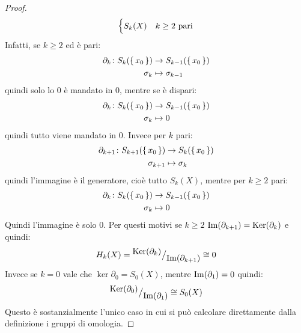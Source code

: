 \begin{proof}
\[\begin{cases}
      S_k(X)  & \text{$ k \geq 2$ pari}
    \end{cases}
  \]
  Infatti, se $ k \geq 2 $ ed è pari:
  \begin{align*}
    \partial_k \colon S_k(\set{x_0}) & \to S_{k-1}(\set{x_0}) \\
    \sigma_k & \mapsto \sigma_{k-1}
  \end{align*}
  quindi solo lo $ 0 $ è mandato in $ 0 $, mentre se è dispari:
  \begin{align*}
    \partial_k \colon S_k(\set{x_0}) & \to S_{k-1}(\set{x_0}) \\
    \sigma_k & \mapsto 0
  \end{align*}
  quindi tutto viene mandato in $ 0 $.
  Invece per $ k $ pari:
  \begin{align*}
    \partial_{k+1} \colon S_{k+1}(\set{x_0}) & \to S_{k}(\set{x_0}) \\
    \sigma_{k+1} & \mapsto \sigma_{k}
  \end{align*}
  quindi l'immagine è il generatore, cioè tutto $ S_{k}(X) $, mentre per $ k \geq 2$ pari:
  \begin{align*}
    \partial_k \colon S_k(\set{x_0}) & \to S_{k-1}(\set{x_0}) \\
    \sigma_k & \mapsto 0
  \end{align*}
  Quindi l'immagine è solo $ 0 $. Per questi motivi se $ k \geq 2 $
  $ \mathrm{Im}( \partial_{k+1} ) = \mathrm{Ker}( \partial_k) $ e quindi:
  \[
    H_k(X) = {^{\textstyle \mathrm{Ker}( \partial_{k})}\big/_{\textstyle \mathrm{Im}( \partial_{k+1} )}} \cong 0
  \]
  Invece se $ k = 0 $ vale che $ \ker{\partial_0} = S_0(X) $, mentre
  $ \mathrm{Im}( \partial_1 ) = 0 $ quindi:
  \[
    {^{\textstyle \mathrm{Ker}( \partial_{0})}\big/_{\textstyle \mathrm{Im}( \partial_{1} )}} \cong S_0(X)
  \]
  Questo è sostanzialmente l'unico caso in cui si può calcolare
  direttamente dalla definizione i gruppi di omologia.
\end{proof}

